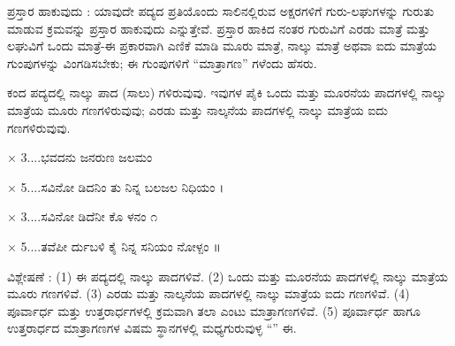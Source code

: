 \indent ಪ್ರಸ್ತಾರ ಹಾಕುವುದು : ಯಾವುದೇ ಪದ್ಯದ ಪ್ರತಿಯೊಂದು ಸಾಲಿನಲ್ಲಿರುವ ಅಕ್ಷರಗಳಿಗೆ ಗುರು-ಲಘುಗಳನ್ನು ಗುರುತು ಮಾಡುವ ಕ್ರಮವನ್ನು ಪ್ರಸ್ತಾರ ಹಾಕುವುದು ಎನ್ನುತ್ತೇವೆ. ಪ್ರಸ್ತಾರ ಹಾಕಿದ ನಂತರ ಗುರುವಿಗೆ ಎರಡು ಮಾತ್ರೆ ಮತ್ತು ಲಘುವಿಗೆ ಒಂದು ಮಾತ್ರೆ-ಈ ಪ್ರಕಾರವಾಗಿ ಎಣಿಕೆ ಮಾಡಿ ಮೂರು ಮಾತ್ರೆ, ನಾಲ್ಕು ಮಾತ್ರೆ ಅಥವಾ ಐದು ಮಾತ್ರೆಯ ಗುಂಪುಗಳನ್ನು ವಿಂಗಡಿಸಬೇಕು; ಈ ಗುಂಪುಗಳಿಗೆ “ಮಾತ್ರಾಗಣ” ಗಳೆಂದು ಹೆಸರು.\par


\vspace{4pt plus 4pt minus 1pt}\hspace{0.5em}ಕಂದ ಪದ್ಯದಲ್ಲಿ ನಾಲ್ಕು ಪಾದ (ಸಾಲು) ಗಳಿರುವುವು. ಇವುಗಳ ಪೈಕಿ ಒಂದು ಮತ್ತು ಮೂರನೆಯ ಪಾದಗಳಲ್ಲಿ ನಾಲ್ಕು ಮಾತ್ರೆಯ ಮೂರು ಗಣಗಳಿರುವುವು; ಎರಡು ಮತ್ತು ನಾಲ್ಕನೆಯ ಪಾದಗಳಲ್ಲಿ ನಾಲ್ಕು ಮಾತ್ರೆಯ ಐದು ಗಣಗಳಿರುವುವು.\par

\vspace{3pt plus 2pt}\noindent\hspace*{1.2em}\par\vspace{1pt}

\indent \laghu{}\laghu{}\laghu{} \laghu{} \laghu{}\laghu{}\laghu{} \laghu{} \laghu{}\laghu{}\guru{}\par

 \ensuremath{\times} 3....ಭವದನು ಜನರುಣ ಜಲಮಂ \laghu{}\laghu{}\guru{} \laghu{}\laghu{}\guru{} \laghu{}\guru{}\laghu{} \laghu{}\laghu{} \laghu{}\laghu{}\guru{}\par

\begin{kbvverse}
 \ensuremath{\times} 5....ಸವಿನೋ ಡಿದನಿಂ ತು ನಿನ್ನ ಬಲಜಲ ನಿಧಿಯಂ ।
\end{kbvverse}

\indent \laghu{}\laghu{}\guru{} \laghu{}\laghu{}\guru{} \laghu{} \laghu{}\guru{}\par

 \ensuremath{\times} 3....ಸವಿನೋ ಡಿದೆನೀ ಕೊ ಳನಂ \laghu{}\laghu{}\guru{} \laghu{}\guru{}\laghu{}\laghu{} ೧ \guru{}\laghu{} \laghu{}\laghu{}\guru{} \guru{} \guru{}\par

\begin{kbvverse}
 \ensuremath{\times} 5....ತವೆಪೀ ರ್ದುಬಳಿ ಕೈ ನಿನ್ನ ಸನಿಯಂ ನೋಳ್ಪಂ ॥
\end{kbvverse}

\indent ವಿಶ್ಲೇಷಣೆ : (1) ಈ ಪದ್ಯದಲ್ಲಿ ನಾಲ್ಕು ಪಾದಗಳಿವೆ. (2) ಒಂದು ಮತ್ತು ಮೂರನೆಯ ಪಾದಗಳಲ್ಲಿ ನಾಲ್ಕು ಮಾತ್ರೆಯ ಮೂರು ಗಣಗಳಿವೆ. (3) ಎರಡು ಮತ್ತು ನಾಲ್ಕನೆಯ ಪಾದಗಳಲ್ಲಿ ನಾಲ್ಕು ಮಾತ್ರೆಯ ಐದು ಗಣಗಳಿವೆ. (4) ಪೂರ್ವಾರ್ಧ ಮತ್ತು ಉತ್ತರಾರ್ಧಗಳಲ್ಲಿ ಕ್ರಮವಾಗಿ ತಲಾ ಎಂಟು ಮಾತ್ರಾಗಣಗಳಿವೆ. (5) ಪೂರ್ವಾರ್ಧ ಹಾಗೂ ಉತ್ತರಾರ್ಧದ ಮಾತ್ರಾಗಣಗಳ ವಿಷಮ ಸ್ಥಾನಗಳಲ್ಲಿ ಮಧ್ಯಗುರುವುಳ್ಳ “\laghu{}\guru{}\laghu{}” ಈ.\par
